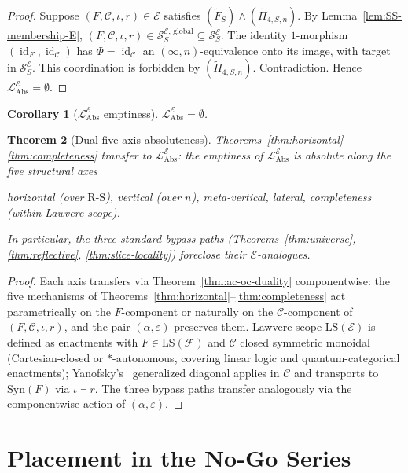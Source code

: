 \documentclass[11pt]{article}
\theoremstyle{plain}
\newtheorem{theorem}{Theorem}[section]
\newtheorem{corollary}[theorem]{Corollary}
\theoremstyle{definition}
\newcommand{\RS}{\mathrm{R\text{-}S}}
\newcommand{\cS}{\mathcal{S}}
\newcommand{\cF}{\mathcal{F}}
\newcommand{\cC}{\mathcal{C}}
\newcommand{\LAbs}{\mathcal{L}_{\mathrm{Abs}}}
\newcommand{\Syn}{\mathrm{Syn}}
\newcommand{\cE}{\mathcal{E}}
\newcommand{\LAbsE}{\LAbs^{\cE}}
\newcommand{\SSE}{\cS_{S}^{\cE}}
\newcommand{\SSEglobal}{\cS_{S}^{\cE,\,\mathrm{global}}}
\DeclareMathOperator{\id}{id}
\begin{document}
\begin{proof}
Suppose $(F, \cC, \iota, r) \in \cE$ satisfies $(\tilde{F}_S) \wedge (\tilde{\Pi}_{4, S, n})$. By Lemma~\ref{lem:SS-membership-E}, $(F, \cC, \iota, r) \in \SSEglobal \subseteq \SSE$. The identity $1$-morphism $(\id_F, \id_\cC)$ has $\Phi = \id_\cC$ an $(\infty, n)$-equivalence onto its image, with target in $\SSE$. This coordination is forbidden by $(\tilde{\Pi}_{4, S, n})$. Contradiction. Hence $\LAbsE = \emptyset$.
\end{proof}

\begin{corollary}[$\LAbsE$ emptiness]\label{cor:level6-empty-cE}
$\LAbsE = \emptyset$.
\end{corollary}

\begin{theorem}[Dual five-axis absoluteness]\label{thm:dual-five-axis}
Theorems~\ref{thm:horizontal}--\ref{thm:completeness} transfer to $\LAbs^\cE$: the emptiness of $\LAbs^\cE$ is absolute along the five structural axes
\begin{center}
\emph{horizontal} (over $\RS$), \quad \emph{vertical} (over $n$), \quad \emph{meta-vertical}, \quad \emph{lateral}, \quad \emph{completeness} (within Lawvere-scope).
\end{center}
In particular, the three standard bypass paths (Theorems~\ref{thm:universe}, \ref{thm:reflective}, \ref{thm:slice-locality}) foreclose their $\cE$-analogues.
\end{theorem}

\begin{proof}
Each axis transfers via Theorem~\ref{thm:ac-oc-duality} componentwise: the five mechanisms of Theorems~\ref{thm:horizontal}--\ref{thm:completeness} act parametrically on the $F$-component or naturally on the $\cC$-component of $(F, \cC, \iota, r)$, and the pair $(\alpha, \varepsilon)$ preserves them. Lawvere-scope $\mathrm{LS}(\cE)$ is defined as enactments with $F \in \mathrm{LS}(\cF)$ and $\cC$ closed symmetric monoidal (Cartesian-closed or $*$-autonomous, covering linear logic and quantum-categorical enactments); Yanofsky's~\cite{Yanofsky2003} generalized diagonal applies in $\cC$ and transports to $\Syn(F)$ via $\iota \dashv r$. The three bypass paths transfer analogously via the componentwise action of $(\alpha, \varepsilon)$.
\end{proof}

\section{Placement in the No-Go Series}\label{sec:series}
\end{document}
